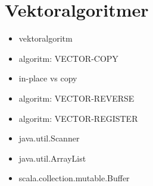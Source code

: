 \chapter{Vektoralgoritmer}\label{chapter:W05}
\begin{multicols}{2}\begin{itemize}[nosep,label={$\square$}]
\item vektoralgoritm
\item algoritm: VECTOR-COPY
\item in-place vs copy
\item algoritm: VECTOR-REVERSE
\item algoritm: VECTOR-REGISTER
\item java.util.Scanner
\item java.util.ArrayList
\item scala.collection.mutable.Buffer\end{itemize}\end{multicols}
